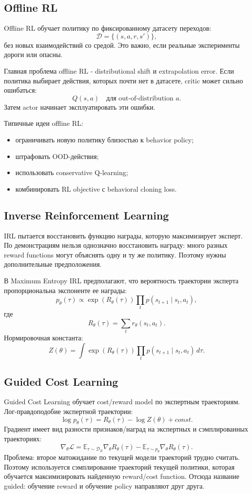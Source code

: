 \documentclass[11pt,a4paper]{article}
\newcommand{\E}{\mathbb{E}}
\newcommand{\1}{\mathbf{1}}
\newcommand{\cD}{\mathcal D}
\newcommand{\dd}{\,d}
\begin{document}
\subsection*{Offline RL}
Offline RL обучает политику по фиксированному датасету переходов:
\[
    \cD=\{(s,a,r,s')\},
\]
без новых взаимодействий со средой. Это важно, если реальные эксперименты дороги или опасны.

Главная проблема offline RL - distributional shift и extrapolation error. Если политика выбирает действия, которых почти нет в датасете, critic может сильно ошибаться:
\[
    Q(s,a)\quad \text{для out-of-distribution } a.
\]
Затем actor начинает эксплуатировать эти ошибки.

Типичные идеи offline RL:
\begin{itemize}
    \item ограничивать новую политику близостью к behavior policy;
    \item штрафовать OOD-действия;
    \item использовать conservative Q-learning;
    \item комбинировать RL objective с behavioral cloning loss.
\end{itemize}

\subsection*{Inverse Reinforcement Learning}
IRL пытается восстановить функцию награды, которую максимизирует эксперт. По демонстрациям нельзя однозначно восстановить награду: много разных reward functions могут объяснять одну и ту же политику. Поэтому нужны дополнительные предположения.

В Maximum Entropy IRL предполагают, что вероятность траектории эксперта пропорциональна экспоненте ее награды:
\[
    p_\theta(\tau)\propto \exp(R_\theta(\tau))\prod_t p(s_{t+1}\mid s_t,a_t),
\]
где
\[
    R_\theta(\tau)=\sum_t r_\theta(s_t,a_t).
\]
Нормировочная константа:
\[
    Z(\theta)=\int \exp(R_\theta(\tau))\prod_t p(s_{t+1}\mid s_t,a_t)\dd\tau.
\]

\subsection*{Guided Cost Learning}
Guided Cost Learning обучает cost/reward model по экспертным траекториям. Лог-правдоподобие экспертной траектории:
\[
    \log p_\theta(\tau)=R_\theta(\tau)-\log Z(\theta)+const.
\]
Градиент имеет вид разности признаков/наград на экспертных и сэмплированных траекториях:
\[
    \nabla_\theta \mathcal L
    =\E_{\tau\sim\cD_E}\nabla_\theta R_\theta(\tau)
    -\E_{\tau\sim p_\theta}\nabla_\theta R_\theta(\tau).
\]
Проблема: второе матожидание по текущей модели траекторий трудно считать. Поэтому используется сэмплирование траекторий текущей политики, которая обучается максимизировать найденную reward/cost function. Отсюда название guided: обучение reward и обучение policy направляют друг друга.
\end{document}

